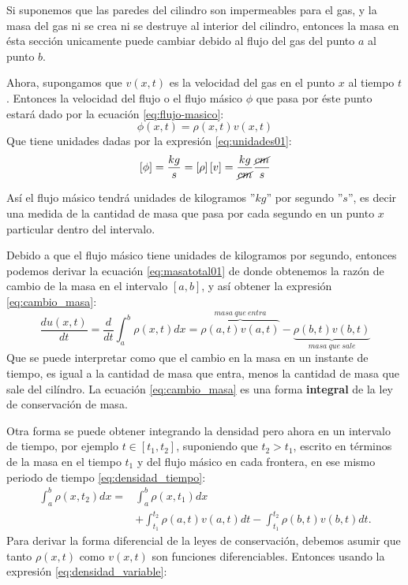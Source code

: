 Si suponemos que las paredes del cilindro son impermeables para el gas, y la masa del gas ni se crea ni se destruye
al interior del cilindro, entonces la masa en ésta sección unicamente puede cambiar debido al flujo del gas
del punto $a$ al punto $b$.

Ahora, supongamos que $v(x,t)$ es la velocidad del gas en el punto $x$ al tiempo $t$.  Entonces la 
velocidad del flujo o el flujo másico $\phi$ que pasa por éste punto estará dado por la ecuación 
\eqref{eq:flujo-masico}:
\begin{equation}\label{eq:flujo-masico}
    \phi(x,t) = \rho(x,t)v(x,t)
\end{equation}
Que tiene unidades dadas por la expresión \eqref{eq:unidades01}:
\begin{equation}\label{eq:unidades01}
    \left[\phi\right]=\frac{kg}{s} = \left[\rho\right]\left[v\right]= \frac{kg}{\cancel{cm}}\frac{\cancel{cm}}{s}
\end{equation}

Así el flujo másico tendrá unidades de kilogramos ''$kg$'' por segundo ''$s$'', es decir una medida de la 
cantidad de masa que pasa por cada segundo en un punto $x$ particular dentro del intervalo.

Debido a que el flujo másico tiene unidades de kilogramos por segundo, entonces podemos derivar la 
ecuación \eqref{eq:masatotal01} de donde obtenemos la razón de cambio de la masa en el intervalo
$[a,b]$, y así obtener la expresión \eqref{eq:cambio_masa}:
\begin{equation}\label{eq:cambio_masa}
    \frac{d u(x,t)}{dt} = \frac{d}{dt}\int_a^b\rho(x,t)dx=\overbrace{\rho(a,t)v(a,t)}^{masa\ que\ entra}
    -\underbrace{\rho(b,t)v(b,t)}_{masa\ que\ sale}
\end{equation}
Que se puede interpretar como que el cambio en la masa en un instante de tiempo, es igual a la cantidad 
de masa que entra, menos la cantidad de masa que sale del cilíndro. La ecuación \eqref{eq:cambio_masa}
es una forma \textbf{integral} de la ley de conservación de masa. 

Otra forma se puede obtener integrando la densidad pero ahora en un intervalo de tiempo, por ejemplo $t\in [t_1,t_2]$, suponiendo que $t_2>t_1$, escrito en términos de la masa en el tiempo $t_1$ y del flujo másico en cada frontera, en ese mismo periodo de tiempo  \eqref{eq:densidad_tiempo}:
\begin{equation}\label{eq:densidad_tiempo}
\begin{aligned}
\int_{a}^{b} \rho\left(x, t_{2}\right) d x=& \int_{a}^{b} \rho\left(x, t_{1}\right) d x \\
&+\int_{t_{1}}^{t_{2}} \rho\left(a, t\right) v\left(a, t\right) d t-\int_{t_{1}}^{t_{2}} \rho\left(b, t\right) v\left(b, t\right) d t .
\end{aligned}
\end{equation}
Para derivar la forma diferencial de la leyes de conservación, debemos asumir que 
tanto $\rho(x, t)$ como $v(x, t)$ son funciones diferenciables.  Entonces usando la expresión \eqref{eq:densidad_variable}:


